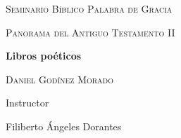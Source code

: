 
%


\begin{titlepage}
	\begin{center}
		\vspace*{1cm}

		{\scshape\LARGE Seminario Bíblico Palabra de Gracia \par}
		\vspace{1cm}
		{\scshape\Large Panorama del Antiguo Testamento II \par}
		\vspace{1.5cm}
		{\huge\bfseries Libros poéticos \par}
		\vspace{2cm}
		{\Large\scshape Daniel Godínez Morado \par}
		\vfill
		Instructor\par
		Filiberto Ángeles Dorantes
		\vfill

		{\large {}}
	\end{center}

\end{titlepage}
%


